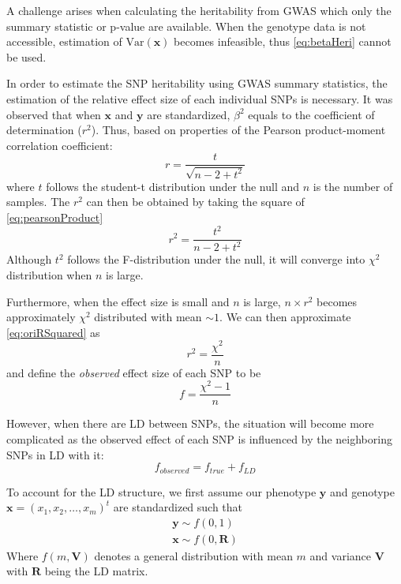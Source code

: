 			A challenge arises when calculating the heritability from \gls{GWAS} which only the summary statistic or p-value are available.
			When the genotype data is not accessible, estimation of $\mathrm{Var}(\boldsymbol{x})$ becomes infeasible, thus \cref{eq:betaHeri} cannot be used. 
			
			In order to estimate the \gls{SNP} heritability using \gls{GWAS} summary statistics, the estimation of the relative effect size of each individual \glspl{SNP} is necessary. 
			It was observed that when $\boldsymbol{x}$ and $\boldsymbol{y}$ are standardized, $\beta^2$ equals to the coefficient of determination ($r^2$). 
			Thus, based on properties of the Pearson product-moment correlation coefficient:
			\begin{equation}
				r = \frac{t}{\sqrt{n-2+t^2}}
				\label{eq:pearsonProduct}
			\end{equation}
			where $t$ follows the student-t distribution under the null and $n$ is the number of samples.
			The $r^2$ can then be obtained by taking the square of \cref{eq:pearsonProduct}
			\begin{equation}
				r^2 = \frac{t^2}{n-2+t^2}
				\label{eq:oriRSquared}
			\end{equation}
			Although $t^2$ follows the F-distribution under the null, it will converge into $\chi^2$ distribution when $n$ is large.
			
			Furthermore, when the effect size is small and $n$ is large, $n\times r^2$ becomes approximately $\chi^2$ distributed with mean $\sim 1$. 
			We can then approximate \cref{eq:oriRSquared} as
			\begin{equation}
				r^2= \frac{\chi^2}{n}
				\label{eq:approxChi}
			\end{equation}
			and define the \emph{observed} effect size of each \gls{SNP} to be
			\begin{equation}
			f=\frac{\chi^2-1}{n}
			\label{eq:observedEffect}
			\end{equation}
			
			However, when there are \gls{LD} between \glspl{SNP}, the situation will become more complicated as the observed effect of each \gls{SNP} is influenced by the neighboring \glspl{SNP} in \gls{LD} with it:
			\begin{equation}
			f_{observed} = f_{true}+f_{LD}
			\label{eq:conceptF}
			\end{equation}
			
			To account for the \gls{LD} structure, we first assume our phenotype $\boldsymbol{y}$ and genotype $\boldsymbol{x}=(x_1,x_2,\dots,x_m)^t$ are standardized such that
			\begin{align*}
				\boldsymbol{y}\sim f(0,1) \\
				\boldsymbol{x}\sim f(0,\boldsymbol{R})
			\end{align*}
			Where $f(m, \boldsymbol{V})$ denotes a general distribution with mean $m$ and variance $\boldsymbol{V}$ with $\boldsymbol{R}$ being the \gls{LD} matrix.
			
